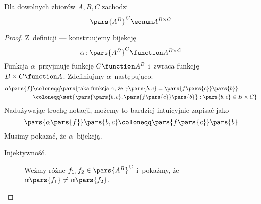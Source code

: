 \begin{theorem}
Dla dowolnych zbiorów \(A, B, C\) zachodzi
\begin{equation*}
    \pars{A^B}^C \eqnum A^{B \times C}
\end{equation*}
\end{theorem}
\begin{proof}
Z~definicji --- konstruujemy bijekcję
\begin{equation*}
    \alpha\colon \pars{A^B}^C \function A^{B \times C}
\end{equation*}
Funkcja \(\alpha\)~przyjmuje funkcję \(C \function A^B\) i~zwraca funkcję \(B \times C \function A\). Zdefiniujmy \(\alpha\)~następująco:
\begin{equation*}
    \begin{split}
        \alpha\pars{f}
            &\coloneqq \pars{\text{taka funkcja \(\gamma\), że \(\gamma\pars{b, c} = \pars{f\pars{c}}\pars{b}\)}}\\
            &\coloneqq \set{\pars{\pars{b, c}, \pars{f\pars{c}}\pars{b}} : \pars{b, c} \in B \times C}
    \end{split}
\end{equation*}
Nadużywając trochę notacji, możemy to bardziej intuicyjnie zapisać jako
\begin{equation*}
    \pars{\alpha\pars{f}}\pars{b, c} \coloneqq \pars{f\pars{c}}\pars{b}
\end{equation*}
Musimy pokazać, że \(\alpha\)~bijekcją.
\begin{description}
    \item[Injektywność.] Weźmy różne \(f_1, f_2 \in \pars{A^B}^C\) i~pokażmy, że \(\alpha\pars{f_1} \neq \alpha\pars{f_2}\).


\end{description}
\end{proof}
